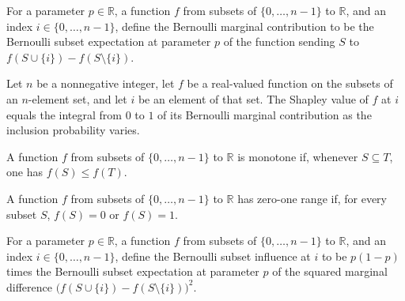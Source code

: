 \begin{definition}
\label{FABL.bernoulliMarginalContribution}
\leanok
{}
For a parameter $p\in\mathbb R$, a function $f$ from subsets of $\{0,\ldots,n-1\}$ to
$\mathbb R$, and an index $i\in\{0,\ldots,n-1\}$, define the Bernoulli marginal
contribution to be the Bernoulli subset expectation at parameter $p$ of the function
sending $S$ to $f(S\cup\{i\})-f(S\setminus\{i\})$.
\end{definition}

\begin{theorem}
\label{FABL.shapleyValue_eq_integral_bernoulliMarginalContribution}
\leanok
{}
Let $n$ be a nonnegative integer, let $f$ be a real-valued function on the subsets of an
$n$-element set, and let $i$ be an element of that set. The Shapley value of $f$ at $i$
equals the integral from $0$ to $1$ of its Bernoulli marginal contribution as the
inclusion probability varies.
\end{theorem}

\begin{definition}
\label{FABL.IsMonotoneSubsetFunction}
\leanok
A function $f$ from subsets of $\{0,\ldots,n-1\}$ to $\mathbb R$ is monotone if,
whenever $S\subseteq T$, one has $f(S)\le f(T)$.
\end{definition}

\begin{definition}
\label{FABL.HasZeroOneRange}
\leanok
A function $f$ from subsets of $\{0,\ldots,n-1\}$ to $\mathbb R$ has zero-one range if,
for every subset $S$, $f(S)=0$ or $f(S)=1$.
\end{definition}

\begin{definition}
\label{FABL.bernoulliSubsetInfluence}
\leanok
{}
For a parameter $p\in\mathbb R$, a function $f$ from subsets of $\{0,\ldots,n-1\}$ to
$\mathbb R$, and an index $i\in\{0,\ldots,n-1\}$, define the Bernoulli subset influence
at $i$ to be $p(1-p)$ times the Bernoulli subset expectation at parameter $p$ of the
squared marginal difference $\bigl(f(S\cup\{i\})-f(S\setminus\{i\})\bigr)^2$.
\end{definition}

